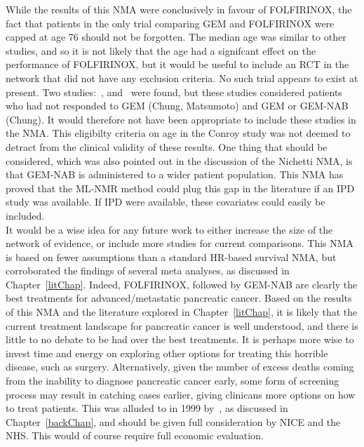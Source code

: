 While the results of this NMA were conclusively in favour of FOLFIRINOX, the fact that patients in the only trial comparing GEM and FOLFIRINOX were capped at age 76 should not be forgotten. The median age was similar to other studies, and so it is not likely that the age had a signifcant effect on the performance of FOLFIRINOX, but it would be useful to include an RCT in the network that did not have any exclusion criteria. No such trial appears to exist at present. Two studies:~\cite{matsumoto}, and~\cite{chung} were found, but these studies considered patients who had not responded to GEM (Chung, Matsumoto) and GEM or GEM-NAB (Chung). It would therefore not have been appropriate to include these studies in the NMA. This eligibilty criteria on age in the Conroy study was not deemed to detract from the clinical validity of these results. One thing that should be considered, which was also pointed out in the discussion of the Nichetti NMA, is that GEM-NAB is administered to a wider patient population. This NMA has proved that the ML-NMR method could plug this gap in the literature if an IPD study was available. If IPD were available, these covariates could easily be included. \\

It would be a wise idea for any future work to either increase the size of the network of evidence, or include more studies for current comparisons. This NMA is based on fewer assumptions than a standard HR-based survival NMA, but corroborated the findings of several meta analyses, as discussed in Chapter~\ref{litChap}. Indeed, FOLFIRINOX, followed by GEM-NAB are clearly the best treatments for advanced/metastatic pancreatic cancer. Based on the results of this NMA and the literature explored in Chapter~\ref{litChap}, it is likely that the current treatment landscape for pancreatic cancer is well understood, and there is little to no debate to be had over the best treatments. It is perhaps more wise to invest time and energy on exploring other options for treating this horrible disease, such as surgery. Alternatively, given the number of excess deaths coming from the inability to diagnose pancreatic cancer early, some form of screening process may result in catching cases earlier, giving clinicans more options on how to treat patients. This was alluded to in 1999 by~\cite{dimagno}, as discussed in Chapter~\ref{backChap}, and should be given full consideration by NICE and the NHS. This would of course require full economic evaluation. \\

